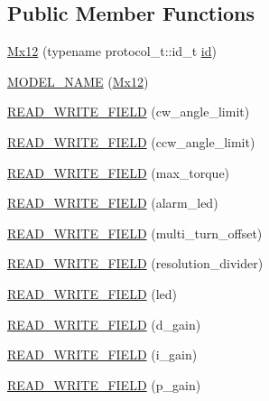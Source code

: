 \subsection*{Public Member Functions}
\begin{DoxyCompactItemize}
\item 
\hyperlink{classdynamixel_1_1servos_1_1_mx12_a476aaf5e768593e990d0e061cd9ca197}{Mx12} (typename protocol\+\_\+t\+::id\+\_\+t \hyperlink{classdynamixel_1_1servos_1_1_servo_a2d022081672e25a7bb57b76706e1cc57}{id})
\item 
\hyperlink{classdynamixel_1_1servos_1_1_mx12_a59759d5c646a78414bffbbf742ac7586}{M\+O\+D\+E\+L\+\_\+\+N\+A\+ME} (\hyperlink{classdynamixel_1_1servos_1_1_mx12}{Mx12})
\item 
\hyperlink{classdynamixel_1_1servos_1_1_mx12_ac41912ef6488c1a03960e9c819b5450e}{R\+E\+A\+D\+\_\+\+W\+R\+I\+T\+E\+\_\+\+F\+I\+E\+LD} (cw\+\_\+angle\+\_\+limit)
\item 
\hyperlink{classdynamixel_1_1servos_1_1_mx12_ac66e715ef314e047b68524a191869921}{R\+E\+A\+D\+\_\+\+W\+R\+I\+T\+E\+\_\+\+F\+I\+E\+LD} (ccw\+\_\+angle\+\_\+limit)
\item 
\hyperlink{classdynamixel_1_1servos_1_1_mx12_a883c5a1070e6e4d2dbb54999863a3012}{R\+E\+A\+D\+\_\+\+W\+R\+I\+T\+E\+\_\+\+F\+I\+E\+LD} (max\+\_\+torque)
\item 
\hyperlink{classdynamixel_1_1servos_1_1_mx12_a70bcf2830d2e0df2f6bd7d029c6be8b9}{R\+E\+A\+D\+\_\+\+W\+R\+I\+T\+E\+\_\+\+F\+I\+E\+LD} (alarm\+\_\+led)
\item 
\hyperlink{classdynamixel_1_1servos_1_1_mx12_a9532340710fd31121d826a067362e853}{R\+E\+A\+D\+\_\+\+W\+R\+I\+T\+E\+\_\+\+F\+I\+E\+LD} (multi\+\_\+turn\+\_\+offset)
\item 
\hyperlink{classdynamixel_1_1servos_1_1_mx12_a820541801caf5af517fa97ea253e1d07}{R\+E\+A\+D\+\_\+\+W\+R\+I\+T\+E\+\_\+\+F\+I\+E\+LD} (resolution\+\_\+divider)
\item 
\hyperlink{classdynamixel_1_1servos_1_1_mx12_a0d9f90d866bdde9fd980db76843df42f}{R\+E\+A\+D\+\_\+\+W\+R\+I\+T\+E\+\_\+\+F\+I\+E\+LD} (led)
\item 
\hyperlink{classdynamixel_1_1servos_1_1_mx12_a205f60e3df38ed8a268315d4f4be122a}{R\+E\+A\+D\+\_\+\+W\+R\+I\+T\+E\+\_\+\+F\+I\+E\+LD} (d\+\_\+gain)
\item 
\hyperlink{classdynamixel_1_1servos_1_1_mx12_a03bc9abb10dc3083383b368fe2bae0f6}{R\+E\+A\+D\+\_\+\+W\+R\+I\+T\+E\+\_\+\+F\+I\+E\+LD} (i\+\_\+gain)
\item 
\hyperlink{classdynamixel_1_1servos_1_1_mx12_ad2873fc48cc91c330dcc386dcc20baba}{R\+E\+A\+D\+\_\+\+W\+R\+I\+T\+E\+\_\+\+F\+I\+E\+LD} (p\+\_\+gain)

\end{DoxyCompactItemize}
